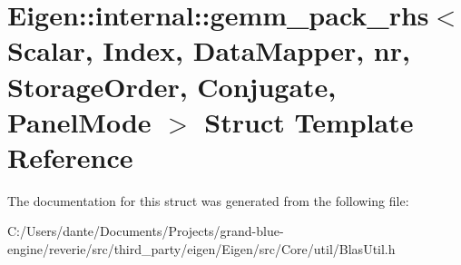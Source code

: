 \hypertarget{struct_eigen_1_1internal_1_1gemm__pack__rhs}{}\section{Eigen\+::internal\+::gemm\+\_\+pack\+\_\+rhs$<$ Scalar, Index, Data\+Mapper, nr, Storage\+Order, Conjugate, Panel\+Mode $>$ Struct Template Reference}
\label{struct_eigen_1_1internal_1_1gemm__pack__rhs}


The documentation for this struct was generated from the following file\+:\begin{DoxyCompactItemize}
\item 
C\+:/\+Users/dante/\+Documents/\+Projects/grand-\/blue-\/engine/reverie/src/third\+\_\+party/eigen/\+Eigen/src/\+Core/util/Blas\+Util.\+h\end{DoxyCompactItemize}
